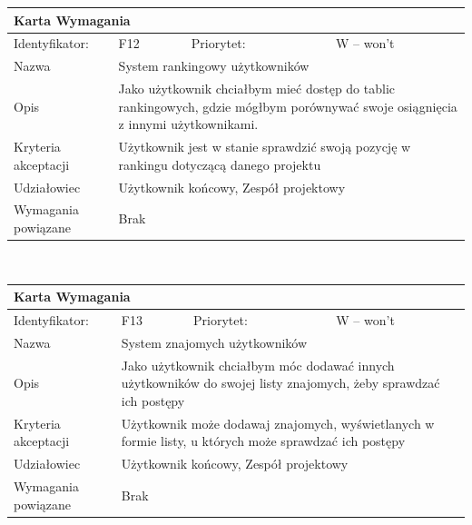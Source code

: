 \documentclass[a4paper,11pt]{report}
\begin{document}
		\newline
		\vspace*{0,2 cm}
		\newline
		\begin{tabular}{|p{3cm}|p{2cm}|p{2cm}|p{6cm}|}
		\hline
		\multicolumn{4}{|p{12 cm}|}{Karta Wymagania}\\
		\hline
		Identyfikator: & F12 & Priorytet: & W – won't\\
		\hline
		Nazwa & \multicolumn{3}{|p{10 cm}|}{System rankingowy użytkowników}\\
		\hline
		Opis & \multicolumn{3}{|p{10 cm}|}{Jako użytkownik chciałbym mieć dostęp do tablic rankingowych, gdzie mógłbym porównywać swoje osiągnięcia z innymi użytkownikami.}\\
		\hline
		Kryteria akceptacji & \multicolumn{3}{|p{10 cm}|}{Użytkownik jest w stanie sprawdzić swoją pozycję w rankingu dotyczącą danego projektu}\\
		\hline
		Udziałowiec & \multicolumn{3}{|p{10 cm}|}{Użytkownik końcowy, Zespół projektowy}\\
		\hline
		Wymagania powiązane & \multicolumn{3}{|p{10 cm}|}{Brak}\\
		\hline
		\end{tabular}\\
		\newline
		\vspace*{0,2 cm}
		\newline
		\begin{tabular}{|p{3cm}|p{2cm}|p{2cm}|p{6cm}|}
		\hline
		\multicolumn{4}{|p{12 cm}|}{Karta Wymagania}\\
		\hline
		Identyfikator: & F13 & Priorytet: & W – won't \\
		\hline
		Nazwa & \multicolumn{3}{|p{10 cm}|}{System znajomych użytkowników}\\
		\hline
		Opis & \multicolumn{3}{|p{10 cm}|}{Jako użytkownik chciałbym móc dodawać innych użytkowników do swojej listy znajomych, żeby sprawdzać ich postępy}\\
		\hline
		Kryteria akceptacji & \multicolumn{3}{|p{10 cm}|}{Użytkownik może dodawaj znajomych, wyświetlanych w formie listy, u których może sprawdzać ich postępy}\\
		\hline
		Udziałowiec & \multicolumn{3}{|p{10 cm}|}{Użytkownik końcowy, Zespół projektowy}\\
		\hline
		Wymagania powiązane & \multicolumn{3}{|p{10 cm}|}{Brak}\\
		\hline
		\end{tabular}\\
\end{document}
